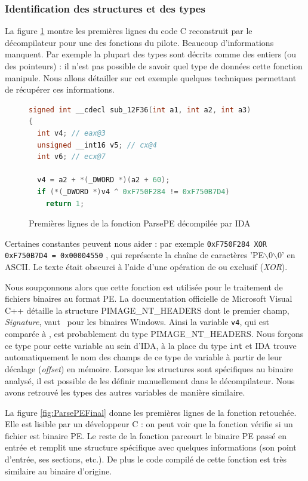 \subsubsection{Identification des structures et des types}
La figure \ref{fig:ParsePEInitial} montre les premières lignes du code C reconstruit par le décompilateur pour une des fonctions du pilote.
Beaucoup d'informations manquent. Par exemple la plupart des types sont décrits comme des entiers (ou des pointeurs) : il n'est pas possible de savoir quel type de données cette fonction manipule.
Nous allons détailler sur cet exemple quelques techniques permettant de récupérer ces informations.

\begin{figure}[h]
\begin{center}
\begin{lstlisting}[language={C}]
signed int __cdecl sub_12F36(int a1, int a2, int a3)
{
  int v4; // eax@3
  unsigned __int16 v5; // cx@4
  int v6; // ecx@7

  v4 = a2 + *(_DWORD *)(a2 + 60);
  if (*(_DWORD *)v4 ^ 0xF750F284 != 0xF750B7D4)
    return 1;
\end{lstlisting}
\end{center}
\caption{Premières lignes de la fonction ParsePE décompilée par IDA\label{fig:ParsePEInitial}}
\end{figure}

Certaines constantes peuvent nous aider : par exemple \texttt{0xF750F284 XOR 0xF750B7D4 = 0x00004550} , qui représente la chaîne de caractères 'PE$\backslash$0$\backslash$0' en ASCII. Le texte était obscurci à l'aide d'une opération de ou exclusif (\emph{XOR}).

Nous soupçonnons alors que cette fonction est utilisée pour le traitement de fichiers binaires au format PE.
La documentation officielle de Microsoft Visual C++ détaille la structure PIMAGE\_NT\_HEADERS dont le premier champ, \emph{Signature}, vaut \PEzz\ pour les binaires Windows.
Ainsi la variable \texttt{v4}, qui est comparée à \PEzz, est probablement du type PIMAGE\_NT\_HEADERS.
Nous forçons ce type pour cette variable au sein d'IDA, à la place du type \texttt{int} et IDA trouve automatiquement le nom des champs de ce type de variable à partir de leur décalage (\emph{offset}) en mémoire.
Lorsque les structures sont spécifiques au binaire analysé, il est possible de les définir manuellement dans le décompilateur.
Nous avons retrouvé les types des autres variables de manière similaire.

La figure \ref{fig:ParsePEFinal} donne les premières lignes de la fonction retouchée.
Elle est lisible par un développeur C : on peut voir que la fonction vérifie si un fichier est binaire PE.
Le reste de la fonction parcourt le binaire PE passé en entrée et remplit une structure spécifique avec quelques informations (son point d'entrée, ses sections, etc.).
De plus le code compilé de cette fonction est très similaire au binaire d'origine.


